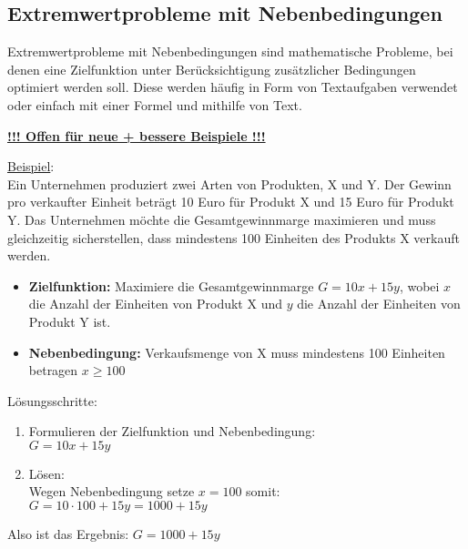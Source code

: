 \subsection{Extremwertprobleme mit Nebenbedingungen}
Extremwertprobleme mit Nebenbedingungen sind mathematische Probleme, 
bei denen eine Zielfunktion unter Berücksichtigung zusätzlicher Bedingungen optimiert werden soll. 
Diese werden häufig in Form von Textaufgaben verwendet oder einfach mit einer Formel und mithilfe von Text.
\par
\secspacebig
\underline{\textbf{!!! Offen für neue + bessere Beispiele !!!}} 
\par
\underline{Beispiel}: \\
Ein Unternehmen produziert zwei Arten von Produkten, X und Y. 
Der Gewinn pro verkaufter Einheit beträgt 10 Euro für Produkt X und 15 Euro für Produkt Y. 
Das Unternehmen möchte die Gesamtgewinnmarge maximieren und muss gleichzeitig sicherstellen, 
dass mindestens 100 Einheiten des Produkts X verkauft werden.
\begin{itemize}
    \item \textbf{Zielfunktion:} Maximiere die Gesamtgewinnmarge $G = 10x + 15y$, 
        wobei $x$ die Anzahl der Einheiten von Produkt X und $y$ die Anzahl der Einheiten von Produkt Y ist.
    \item \textbf{Nebenbedingung:} Verkaufsmenge von X muss mindestens 100 Einheiten betragen $x \geq 100$
\end{itemize}
Lösungsschritte:
\begin{enumerate}
    \item Formulieren der Zielfunktion und Nebenbedingung: \\
        $G = 10x + 15y$
    \item Lösen: \\
        Wegen Nebenbedingung setze $x = 100$ somit: \\
        $G = 10 \cdot 100 + 15y = 1000 + 15y$
\end{enumerate}
Also ist das Ergebnis: $G = 1000 + 15y$ \\\\
\
